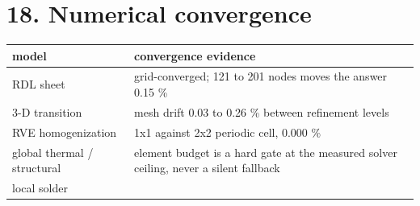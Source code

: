 \documentclass[10pt,]{article}
\begin{document}
\newpage

\hypertarget{numerical-convergence}{%
\section{18. Numerical convergence}\label{numerical-convergence}}

\begin{longtable}[]{@{}ll@{}}
\toprule
\begin{minipage}[b]{0.47\columnwidth}\raggedright
model\strut
\end{minipage} & \begin{minipage}[b]{0.47\columnwidth}\raggedright
convergence evidence\strut
\end{minipage}\tabularnewline
\midrule
\endhead
\begin{minipage}[t]{0.47\columnwidth}\raggedright
RDL sheet\strut
\end{minipage} & \begin{minipage}[t]{0.47\columnwidth}\raggedright
grid-converged; 121 to 201 nodes moves the answer 0.15 \%\strut
\end{minipage}\tabularnewline
\begin{minipage}[t]{0.47\columnwidth}\raggedright
3-D transition\strut
\end{minipage} & \begin{minipage}[t]{0.47\columnwidth}\raggedright
mesh drift 0.03 to 0.26 \% between refinement levels\strut
\end{minipage}\tabularnewline
\begin{minipage}[t]{0.47\columnwidth}\raggedright
RVE homogenization\strut
\end{minipage} & \begin{minipage}[t]{0.47\columnwidth}\raggedright
1x1 against 2x2 periodic cell, 0.000 \%\strut
\end{minipage}\tabularnewline
\begin{minipage}[t]{0.47\columnwidth}\raggedright
global thermal / structural\strut
\end{minipage} & \begin{minipage}[t]{0.47\columnwidth}\raggedright
element budget is a hard gate at the measured solver ceiling, never a
silent fallback\strut
\end{minipage}\tabularnewline
\begin{minipage}[t]{0.47\columnwidth}\raggedright
local solder\strut
\end{minipage} & \begin{minipage}[t]{0.47\columnwidth}\raggedright

\end{minipage}
\end{longtable}
\end{document}
